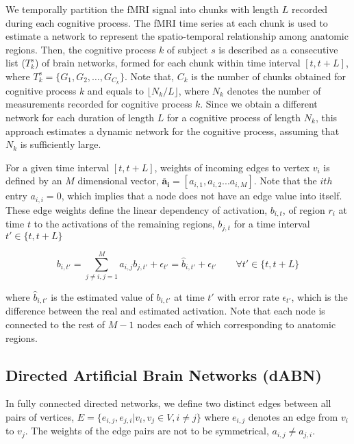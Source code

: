 \documentclass[runningheads]{llncs}
\begin{document}
We temporally partition the fMRI signal into chunks with length $L$ recorded during each cognitive process. The fMRI time series at each chunk is used to estimate a network to represent the spatio-temporal relationship among anatomic regions. Then, the cognitive process $k$ of subject $s$ is described as a consecutive list ($T_{k}^{s}$) of brain networks, formed for each chunk within time interval $[t, t+L]$, where $T_{k}^{s} = \{ G_{1}, G_{2}, \ldots, G_{C_k}\}$. Note that, $C_k$ is the number of chunks obtained for cognitive process $k$ and equals to $\lfloor N_k/L \rfloor$, where $N_k$ denotes the number of measurements recorded for cognitive process $k$. Since we obtain a different network for each duration of length $L$ for a cognitive process of length $N_k$, this approach estimates a dynamic network for the cognitive process, assuming that $N_k$ is sufficiently large. 




For a given time interval $[t, t+L]$, weights of incoming edges to vertex $v_i$ is defined by an $M $ dimensional vector, $\mathbf{\overline{a}_{i}} = [ a_{i,1}, a_{i,2} ... a_{i,M} ]$. Note that the $ith$ entry $a_{i,i} = 0$, which implies that a node does not have an edge value into itself. These edge weights define the linear dependency of activation, $b_{i,t}$, of region $r_i$ at time $t$  to the activations of the remaining regions, $b_{j,t}$ for a time interval $t' \in \{t,t+L\}$

\begin{equation}
b_{i,t'} = \sum_{j\neq i,j=1}^{M} a_{i,j} b_{j,t'} + \epsilon_{t'} = \hat{b}_{i,t'} + \epsilon_{t'}  \qquad \forall t' \in  \{t,t+L\}  
\label{eq:mesh_region_est}
\end{equation}


where $\hat{b}_{i,t'}$ is the estimated value of $b_{i,t'}$ at time $t'$ with error rate $\epsilon_{t'}$, which is the difference between the real and estimated activation. Note that  each node is connected to the rest of $M-1$  nodes each of which corresponding to anatomic regions.  







\subsection{Directed Artificial Brain Networks (dABN)}

In fully connected directed networks, we define two distinct edges between all pairs of vertices, $E = \{ e_{i,j}, e_{j,i}| v_i,v_j \in V, i \neq j \}$ where $e_{i,j}$ denotes an edge from $v_i$ to $v_j$. The weights of the edge pairs are not to be symmetrical, $a_{i,j} \neq a_{j,i}$.
\end{document}
